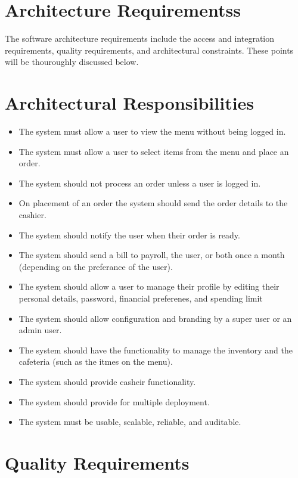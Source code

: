 \documentclass[a4paper,12pt]{article}
\begin{document}
\section{Architecture Requirementss}
The software architecture requirements include the access and integration requirements, quality
requirements, and architectural constraints. These points will be thouroughly discussed below.

\section{Architectural Responsibilities}
\begin{itemize}

\item The system must allow a user to view the menu without being logged in.
\item The system must allow a user to select items from the menu and place an order.
\item The system should not process an order unless a user is logged in.
\item On placement of an order the system should send the order details to the cashier.
\item The system should notify the user when their order is ready.
\item The system should send a bill to payroll, the user, or both once a month (depending on the preferance of the user).
\item The system should allow a user to manage their profile by editing their personal details, password, financial preferenes, and spending limit
\item The system should allow configuration and branding by a super user or an admin user.
\item The system should have the functionality to manage the inventory and the cafeteria (such as the itmes on the menu).
\item The system should provide casheir functionality.
\item The system should provide for multiple deployment.
\item The system must be usable, scalable, reliable, and auditable.

\end{itemize}

\section{Quality Requirements}
\end{document}
